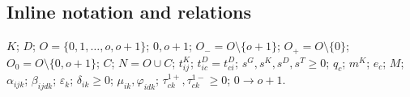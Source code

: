 \documentclass[10pt]{article}
\begin{document}
\subsection*{Inline notation and relations}
$K$; $D$; $O=\{0,1,\ldots,o,o+1\}$; $0,o+1$; $O_-=O\setminus\{o+1\}$; $O_+=O\setminus\{0\}$; $O_0=O\setminus\{0,o+1\}$; $C$; $N=O\cup C$; $t^K_{ij}$; $t^D_{ic}=t^D_{ci}$; $s^G,s^K,s^D,s^T\ge0$; $q_c$; $m^K$; $e_c$; $M$; $\alpha_{ijk}$; $\beta_{ijdk}$; $\varepsilon_k$; $\delta_{ik}\ge0$; $\mu_{ik},\varphi_{idk}$; $\tau_{ck}^{1+},\tau_{ck}^{1-}\ge0$; $0\to o+1$.
\end{document}
